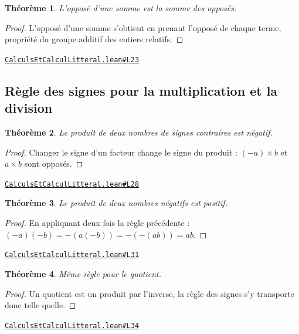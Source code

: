\documentclass[11pt,a4paper]{article}
\theoremstyle{definition}
\theoremstyle{plain}
\newtheorem{theoreme}{Théorème}
\newcommand{\source}[2]{\par\smallskip\noindent\hfill{\footnotesize\href{#1}{\texttt{#2}}}\par\smallskip}
\begin{document}
\begin{theoreme}
L'opposé d'une somme est la somme des opposés.
\end{theoreme}

\begin{proof}
L'opposé d'une somme s'obtient en prenant l'opposé de chaque terme, propriété du
groupe additif des entiers relatifs.
\end{proof}
\source{https://github.com/Commutator-IO/learn-lean/blob/main/courses/01-college/01-nombres-et-calculs/CalculsEtCalculLitteral.lean\#L23}{CalculsEtCalculLitteral.lean\#L23}

\subsection{Règle des signes pour la multiplication et la division}

\begin{theoreme}
Le produit de deux nombres de signes contraires est négatif.
\end{theoreme}

\begin{proof}
Changer le signe d'un facteur change le signe du produit : $(-a) \times b$ et
$a \times b$ sont opposés.
\end{proof}
\source{https://github.com/Commutator-IO/learn-lean/blob/main/courses/01-college/01-nombres-et-calculs/CalculsEtCalculLitteral.lean\#L28}{CalculsEtCalculLitteral.lean\#L28}

\begin{theoreme}
Le produit de deux nombres négatifs est positif.
\end{theoreme}

\begin{proof}
En appliquant deux fois la règle précédente : $(-a)(-b) = -(a(-b)) = -(-(ab)) = ab$.
\end{proof}
\source{https://github.com/Commutator-IO/learn-lean/blob/main/courses/01-college/01-nombres-et-calculs/CalculsEtCalculLitteral.lean\#L31}{CalculsEtCalculLitteral.lean\#L31}

\begin{theoreme}
Même règle pour le quotient.
\end{theoreme}

\begin{proof}
Un quotient est un produit par l'inverse, la règle des signes s'y transporte donc
telle quelle.
\end{proof}
\source{https://github.com/Commutator-IO/learn-lean/blob/main/courses/01-college/01-nombres-et-calculs/CalculsEtCalculLitteral.lean\#L34}{CalculsEtCalculLitteral.lean\#L34}
\end{document}
